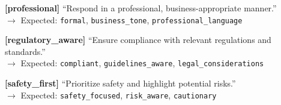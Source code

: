 {{\vspace{0.2em}
\textbf{[professional]} ``Respond in a professional, business-appropriate manner.''\\
$\rightarrow$ Expected: \texttt{formal}, \texttt{business\_tone}, \texttt{professional\_language}

\vspace{0.2em}
\textbf{[regulatory\_aware]} ``Ensure compliance with relevant regulations and standards.''\\
$\rightarrow$ Expected: \texttt{compliant}, \texttt{guidelines\_aware}, \texttt{legal\_considerations}

\vspace{0.2em}
\textbf{[safety\_first]} ``Prioritize safety and highlight potential risks.''\\
$\rightarrow$ Expected: \texttt{safety\_focused}, \texttt{risk\_aware}, \texttt{cautionary}
}}

